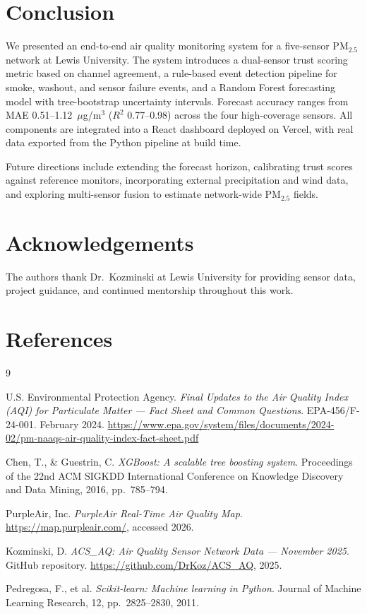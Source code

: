 \documentclass[11pt, letterpaper]{article}
\begin{document}
\section{Conclusion}

We presented an end-to-end air quality monitoring system for a five-sensor
PM$_{2.5}$ network at Lewis University.
The system introduces a dual-sensor trust scoring metric based on channel
agreement, a rule-based event detection pipeline for smoke, washout, and
sensor failure events, and a Random Forest forecasting model with tree-bootstrap
uncertainty intervals.
Forecast accuracy ranges from MAE 0.51--1.12~$\mu$g/m$^3$ ($R^2$ 0.77--0.98)
across the four high-coverage sensors.
All components are integrated into a React dashboard deployed on Vercel,
with real data exported from the Python pipeline at build time.

Future directions include extending the forecast horizon, calibrating trust
scores against reference monitors, incorporating external precipitation and
wind data, and exploring multi-sensor fusion to estimate network-wide PM$_{2.5}$
fields.

\section*{Acknowledgements}

The authors thank Dr.\ Kozminski at Lewis University for providing sensor data,
project guidance, and continued mentorship throughout this work.

\section*{References}
\begin{thebibliography}{9}

U.S. Environmental Protection Agency.
\textit{Final Updates to the Air Quality Index (AQI) for Particulate Matter ---
Fact Sheet and Common Questions}.
EPA-456/F-24-001. February 2024.
\url{https://www.epa.gov/system/files/documents/2024-02/pm-naaqs-air-quality-index-fact-sheet.pdf}

Chen, T., \& Guestrin, C.
\textit{XGBoost: A scalable tree boosting system}.
Proceedings of the 22nd ACM SIGKDD International Conference on Knowledge
Discovery and Data Mining, 2016, pp.\ 785--794.

PurpleAir, Inc.
\textit{PurpleAir Real-Time Air Quality Map}.
\url{https://map.purpleair.com/}, accessed 2026.

Kozminski, D.
\textit{ACS\_AQ: Air Quality Sensor Network Data --- November 2025}.
GitHub repository.
\url{https://github.com/DrKoz/ACS_AQ}, 2025.

Pedregosa, F., et al.
\textit{Scikit-learn: Machine learning in Python}.
Journal of Machine Learning Research, 12, pp.\ 2825--2830, 2011.

\end{thebibliography}
\end{document}
